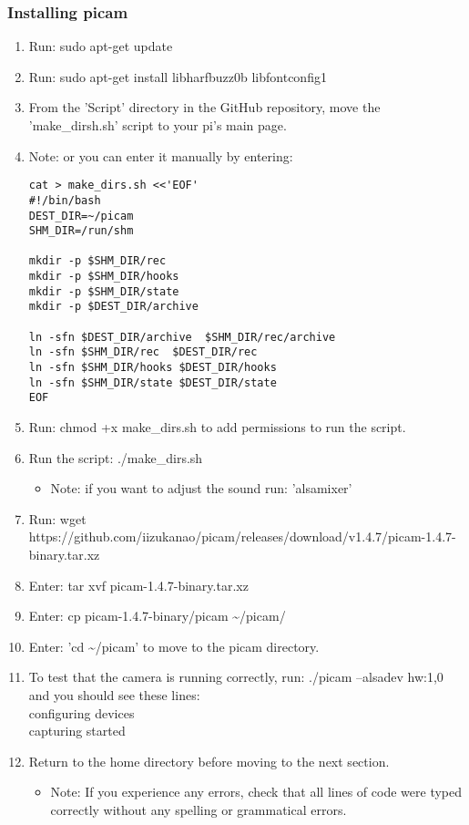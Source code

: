 \documentclass[onecolumn, draftclsnofoot,10pt, compsoc]{IEEEtran}
\begin{document}
\subsubsection{Installing picam}
\begin{enumerate}
\item  Run: sudo apt-get update
\item  Run: sudo apt-get install libharfbuzz0b libfontconfig1 
\item  From the 'Script' directory in the GitHub repository, move the 'make\_dirsh.sh' script to your pi's main page.
\item  Note: or you can enter it manually by entering: 
\begin{lstlisting}
cat > make_dirs.sh <<'EOF' 
#!/bin/bash 
DEST_DIR=~/picam 
SHM_DIR=/run/shm 

mkdir -p $SHM_DIR/rec 
mkdir -p $SHM_DIR/hooks 
mkdir -p $SHM_DIR/state 
mkdir -p $DEST_DIR/archive 

ln -sfn $DEST_DIR/archive  $SHM_DIR/rec/archive 
ln -sfn $SHM_DIR/rec  $DEST_DIR/rec 
ln -sfn $SHM_DIR/hooks $DEST_DIR/hooks 
ln -sfn $SHM_DIR/state $DEST_DIR/state 
EOF
\end{lstlisting}

\item  Run: chmod +x make\_dirs.sh to add permissions to run the script. 
\item  Run the script: ./make\_dirs.sh  
\begin{itemize}
    \item Note: if you want to adjust the sound run: 'alsamixer'
\end{itemize}
\item  Run:
wget https://github.com/iizukanao/picam/releases/download/v1.4.7/picam-1.4.7-binary.tar.xz 
\item  Enter: tar xvf picam-1.4.7-binary.tar.xz 
\item  Enter: cp picam-1.4.7-binary/picam \~{}/picam/ 
\item  Enter: 'cd \~{}/picam' to move to the picam directory. 
\item  To test that the camera is running correctly, run: ./picam --alsadev hw:1,0 and you should see these lines:\\
configuring devices\\
capturing started
\item  Return to the home directory before moving to the next section.
\begin{itemize}
    \item Note: If you experience any errors, check that all lines of code were typed correctly without any spelling or grammatical errors.
\end{itemize}

\end{enumerate}
\end{document}
